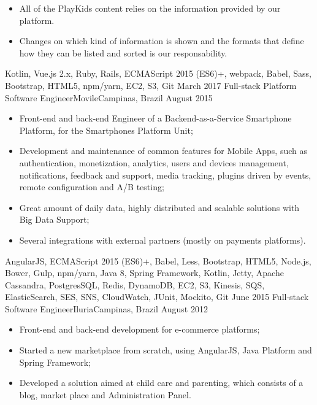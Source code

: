 \begin{experiences}
{\begin{itemize}
      \item All of the PlayKids content relies on the information provided by our platform.\\
      \item Changes on which kind of information is shown and the formats that define how they can be listed and sorted is our responsability.
    \end{itemize}
  }
  {Kotlin, Vue.js 2.x, Ruby, Rails, ECMAScript 2015 (ES6)+, webpack, Babel, Sass, Bootstrap, HTML5, npm/yarn, EC2, S3, Git}
  \emptySeparator
  \experience
    {March 2017}   {Full-stack Platform Software Engineer}{Movile}{Campinas, Brazil}
    {August 2015} {
    \begin{itemize}
      \item Front-end and back-end Engineer of a Backend-as-a-Service Smartphone Platform,
      for the Smartphones Platform Unit;
      \item Development and maintenance of common features for Mobile Apps, such as authentication,
      monetization, analytics, users and devices management, notifications, feedback and support,
      media tracking, plugins driven by events, remote configuration and A/B testing;
      \item Great amount of daily data, highly distributed and scalable solutions with Big Data Support;
      \item Several integrations with external partners (mostly on payments platforms).\\
    \end{itemize}
  }
  {AngularJS, ECMAScript 2015 (ES6)+, Babel, Less, Bootstrap, HTML5, Node.js, Bower, Gulp, npm/yarn, Java 8, Spring Framework, Kotlin, Jetty, Apache Cassandra, PostgresSQL, Redis, DynamoDB, EC2, S3, Kinesis, SQS, ElasticSearch, SES, SNS, CloudWatch, JUnit, Mockito, Git}
  \emptySeparator
  \experience
    {June 2015} {Full-stack Software Engineer}{Iluria}{Campinas, Brazil}
    {August 2012}    {
      \begin{itemize}
        \item Front-end and back-end development for e-commerce platforms;
        \item Started a new marketplace from scratch, using AngularJS, Java Platform and Spring Framework;
        \item Developed a solution aimed at child care and parenting, which consists of a blog, market place and Administration Panel.\\
      \end{itemize}
}
\end{experiences}
